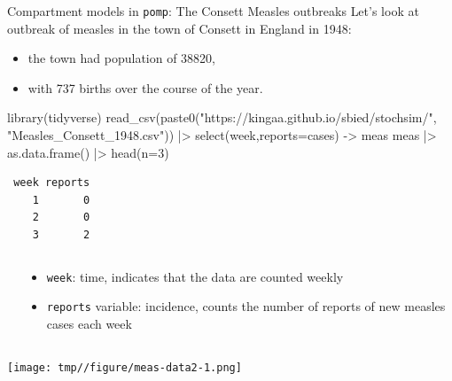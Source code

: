 \documentclass[
  ignorenonframetext,
  aspectratio=169,
  t]{beamer}
\newenvironment{Shaded}{\begin{snugshade}}{\end{snugshade}}
\newcommand{\AttributeTok}[1]{\textcolor[rgb]{0.40,0.45,0.13}{#1}}
\newcommand{\DecValTok}[1]{\textcolor[rgb]{0.68,0.00,0.00}{#1}}
\newcommand{\FunctionTok}[1]{\textcolor[rgb]{0.28,0.35,0.67}{#1}}
\newcommand{\NormalTok}[1]{\textcolor[rgb]{0.00,0.23,0.31}{#1}}
\newcommand{\OtherTok}[1]{\textcolor[rgb]{0.00,0.23,0.31}{#1}}
\newcommand{\SpecialCharTok}[1]{\textcolor[rgb]{0.37,0.37,0.37}{#1}}
\newcommand{\StringTok}[1]{\textcolor[rgb]{0.13,0.47,0.30}{#1}}
\theoremstyle{definition}
\begin{document}
\begin{frame}{Compartment models in
\texttt{pomp}: The Consett Measles outbreaks}
\label{compartment-models-in-pomp-the-consett-measles-outbreaks}
Let's look at outbreak of measles in the town of Consett in England in
1948:

\begin{itemize}
\item
  the town had population of 38820,
\item
  with 737 births over the course of the year.
\end{itemize}

\begin{Shaded}
\begin{Highlighting}[]
\FunctionTok{library}\NormalTok{(tidyverse)}
\FunctionTok{read\_csv}\NormalTok{(}\FunctionTok{paste0}\NormalTok{(}\StringTok{"https://kingaa.github.io/sbied/stochsim/"}\NormalTok{, }
  \StringTok{"Measles\_Consett\_1948.csv"}\NormalTok{)) }\SpecialCharTok{|\textgreater{}} 
  \FunctionTok{select}\NormalTok{(week,}\AttributeTok{reports=}\NormalTok{cases) }\OtherTok{{-}\textgreater{}}\NormalTok{ meas}
\NormalTok{meas }\SpecialCharTok{|\textgreater{}} \FunctionTok{as.data.frame}\NormalTok{() }\SpecialCharTok{|\textgreater{}} \FunctionTok{head}\NormalTok{(}\AttributeTok{n=}\DecValTok{3}\NormalTok{)}
\end{Highlighting}
\end{Shaded}

\begin{verbatim}
 week reports
    1       0
    2       0
    3       2
\end{verbatim}

\vspace{-25mm}

\begin{columns}[T]
\begin{column}{0.3\textwidth}
\end{column}

\begin{column}{0.7\textwidth}
\begin{itemize}
\item
  \texttt{week}: time, indicates that the data are counted weekly
\item
  \texttt{reports} variable: incidence, counts the number of reports of
  new measles cases each week
\end{itemize}
\end{column}
\end{columns}

\framebreak

\begin{center}
\texttt{[image: tmp//figure/meas-data2-1.png]}
\end{center}
\end{frame}
\end{document}
